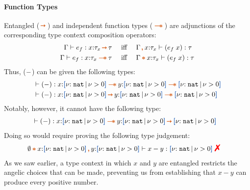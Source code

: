 \paragraph{Function Types}
Entangled ($\ctsarr$) and independent
function types ($\ctwand$) are adjunctions of the corresponding type
context composition operators:
\begin{align*}
  \Gamma \vdash e_f : x{:}\tau_x \ctsarr \tau \quad &\text{ iff } \quad \Gamma \ctcomma x{:}\tau_x \vdash (e_f\;x) : \tau
  \\\Gamma \vdash e_f : x{:}\tau_x \ctwand \tau \quad &\text{ iff } \quad \Gamma \ctstar x{:}\tau_x \vdash (e_f\;x) : \tau
\end{align*}
\noindent Thus, (${\tt -}$) can be given the following types:
\vspace{-0.2em}
\begin{align*}
  &\vdash (-) : x{:}\urt{\Nat}{\vnu > 0} \ctwand y{:}\urt{\Nat}{\vnu > 0} \ctwand \urt{\Nat}{\vnu > 0}
  \\&\vdash (-) : x{:}\urt{\Nat}{\vnu > 0} \ctsarr y{:}\urt{\Nat}{\vnu > 0} \ctwand \urt{\Nat}{\vnu > 0}
\end{align*}\noindent
Notably, however, it cannot have the following type:
\vspace{-0.2em}
\begin{align*}
  &\vdash (-) : x{:}\urt{\Nat}{\vnu > 0} \ctwand y{:}\urt{\Nat}{\vnu > 0} \ctsarr \urt{\Nat}{\vnu > 0}
\end{align*}\noindent
Doing so would require proving the following type judgement:
\vspace{-0.2em}
\begin{align*}
  &\emptyset \ctstar x{:}\urt{\Nat}{\vnu > 0} \ctcomma y{:}\urt{\Nat}{\vnu > 0} \vdash x - y : \urt{\Nat}{\vnu > 0} \;\judgfail
\end{align*}\noindent
As we saw earlier, a type context in which $x$ and $y$ are entangled
restricts the angelic choices that can be made, preventing us from
establishing that $x - y$ can produce every positive number.

